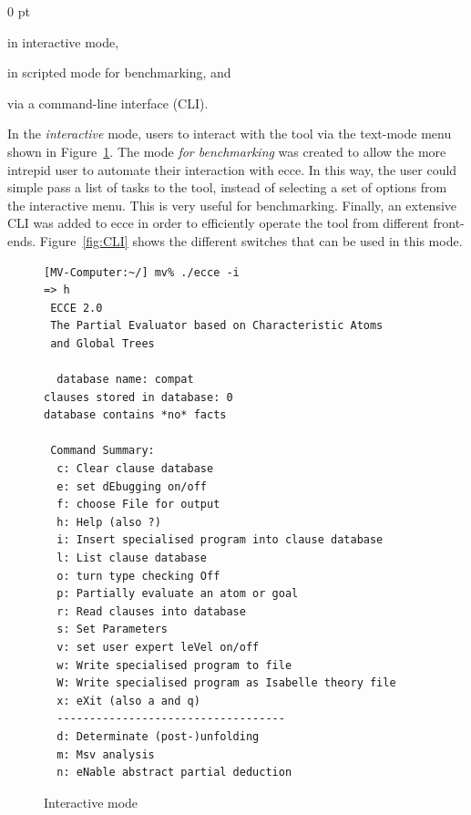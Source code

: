 \documentclass{sig-alternate}
\newenvironment{zitemize}%
   {\begin{list}{--}{
   \setlength{\itemsep}{0 pt}
   \setlength{\parsep}{0 pt}
   \setlength{\topsep} {0 pt} }}%
   {\end{list}}
\begin{document}
\begin{zitemize}
\item in interactive mode,
\item in scripted mode for benchmarking, and
\item via a command-line interface (CLI).
\end{zitemize}

In the {\em interactive} mode, users to interact with the tool via the text-mode menu shown in Figure~\ref{fig:interactive}. The mode {\em for benchmarking} was created to allow the more intrepid user to automate their interaction with {\sc ecce}. In this way, the user could simple pass a list of tasks to the tool, instead of selecting a set of options from the interactive menu. This is very useful for benchmarking. Finally, an extensive CLI was added to {\sc ecce} in order to efficiently operate the tool from different front-ends. Figure~\ref{fig:CLI} shows the different switches that can be used in this mode.  

\begin{figure}[!ht]
\centering
\begin{minipage}[t]{.9\textwidth}
\begin{scriptsize}\begin{verbatim}
[MV-Computer:~/] mv% ./ecce -i
=> h
 ECCE 2.0
 The Partial Evaluator based on Characteristic Atoms 
 and Global Trees

  database name: compat
clauses stored in database: 0
database contains *no* facts

 Command Summary:
  c: Clear clause database
  e: set dEbugging on/off
  f: choose File for output
  h: Help (also ?)
  i: Insert specialised program into clause database
  l: List clause database
  o: turn type checking Off
  p: Partially evaluate an atom or goal
  r: Read clauses into database
  s: Set Parameters
  v: set user expert leVel on/off
  w: Write specialised program to file
  W: Write specialised program as Isabelle theory file
  x: eXit (also a and q)
  ----------------------------------- 
  d: Determinate (post-)unfolding
  m: Msv analysis
  n: eNable abstract partial deduction
\end{verbatim}\end{scriptsize}
\end{minipage}
\caption{Interactive mode}\label{fig:interactive}
\end{figure} 
\end{document}
